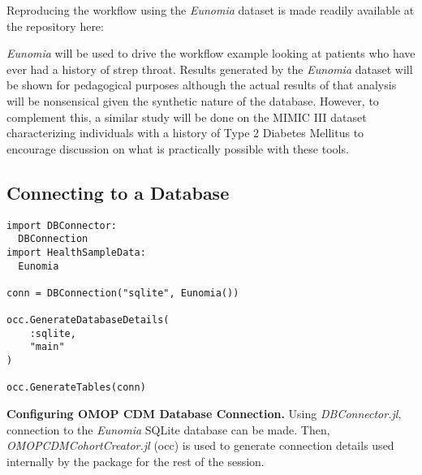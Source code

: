 \documentclass{juliacon}
\begin{document}
Reproducing the workflow using the \textit{Eunomia} dataset is made readily available at the repository here: \cite{schuemieEunomia2023}


\textit{Eunomia} will be used to drive the workflow example looking at patients who have ever had a history of strep throat.
Results generated by the \textit{Eunomia} dataset will be shown for pedagogical purposes although the actual results of that analysis will be nonsensical given the synthetic nature of the database.
However, to complement this, a similar study will be done on the MIMIC III dataset characterizing individuals with a history of Type 2 Diabetes Mellitus to encourage discussion on what is practically possible with these tools.

\subsection{Connecting to a Database}

\begin{listing}[!ht]
\begin{verbatim}
import DBConnector: 
  DBConnection
import HealthSampleData: 
  Eunomia

conn = DBConnection("sqlite", Eunomia())

occ.GenerateDatabaseDetails(
    :sqlite,
    "main"
)

occ.GenerateTables(conn)
\end{verbatim}
\caption{\textbf{Configuring OMOP CDM Database Connection.} Using \textit{DBConnector.jl}, connection to the \textit{Eunomia} SQLite database can be made. Then, \textit{OMOPCDMCohortCreator.jl} (occ) is used to generate connection details used internally by the package for the rest of the session.}
\label{listing:connection}
\end{listing}

\end{document}
